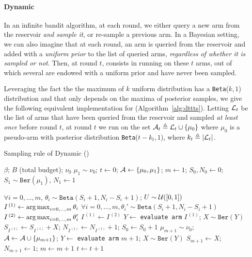 \paragraph{Dynamic \TTTS}


In an infinite bandit algorithm, at each round, we either query a new arm from the reservoir \emph{and sample it}, or re-sample a previous arm. In a Bayesian setting, we can also imagine that at each round, an arm is queried from the reservoir and added with a \textit{uniform prior} to the list of queried arms, \emph{regardless of whether it is sampled or not}. Then, at round $t$, \DTTTS consists in running \TTTS on these $t$ arms, out of which several are endowed with a uniform prior and have never been sampled. 

Leveraging the fact the the maximum of $k$ uniform distribution has a \texttt{Beta}($k,1$) distribution and that \TTTS only depends on the maxima of posterior samples, we give the following equivalent implementation for \DTTTS (Algorithm~\ref{alg:dttts}). Letting $\mathcal{L}_t$ be the list of arms that have been queried  from the reservoir and sampled \textit{at least once} before round $t$, at round $t$ we run \TTTS on the set $\mathcal{A}_t \triangleq \mathcal{L}_t \cup \{\mu_0\}$ where $\mu_0$ is a pseudo-arm with posterior distribution \texttt{Beta}($t-k_t, 1$), where $k_t\triangleq|\mathcal{L}_t|$.  

\begin{algorithm}[tb]
\centering
\caption{Sampling rule of Dynamic \TTTS (\DTTTS)}
\label{alg:dttts}
\begin{algorithmic}[1] %
     $\beta$; $B$ (total budget); $\nu_0$
     $\mu_1 \sim \nu_0$; $t \gets 0$; $\mathcal{A} \gets \{\mu_0,\mu_1\}$; $m\gets1$; $S_0, N_0 \gets 0$; $S_1 \sim \texttt{Ber}(\mu_1)$, $N_1 \gets 1$\
    
	    \State $\forall i=0,\dots,m$, $\theta_i \sim \texttt{Beta}(S_i+1,N_i-S_i+1)$; $U \sim \mathcal{U}([0,1])$
	    \State $I^{\,(1)} \gets \operatorname*{arg\,max}_{i=0,\dots,m} \theta_i$
	            \State $\forall i=0,\dots,m, \theta_i' \sim \texttt{Beta}(S_i+1,N_i-S_i+1)$
	            \State $I^{\,(2)} \leftarrow \operatorname*{arg\,max}_{i=0,\dots,m}\theta_i'$ 
	        \EndWhile
	        \State $I^{\,(1)} \gets I^{\,(2)}$
	    \EndIf
	        \State $Y \leftarrow$ \texttt{evaluate arm} $I^{\,(1)}$; $X \sim \texttt{Ber}(Y)$ 
	        \State $S_{I^{\,(1)}} \gets S_{I^{\,(1)}} + X$; $N_{I^{\,(1)}} \gets N_{I^{\,(1)}} + 1$; $S_0 \gets S_0 + 1$
	    \Else
            \State $\mu_{m+1}\sim \nu_0$; $\mathcal{A} \gets \mathcal{A} \cup \{\mu_{m+1}\}$; 
            \State $Y \leftarrow$ \texttt{evaluate arm} $m+1$; $X \sim \texttt{Ber}(Y)$
           	\State $S_{m+1} \gets X$; $N_{m+1}
           	\gets 1$; $m \gets m + 1$
 	   \EndIf
  	   \State $t\gets t+1$
    \EndWhile
\end{algorithmic}
\end{algorithm}

